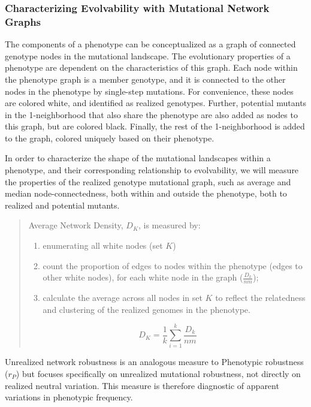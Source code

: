 \subsubsection{Characterizing Evolvability with Mutational Network Graphs}

The components of a phenotype can be conceptualized as a graph of connected genotype nodes in the mutational landscape. The evolutionary properties of a phenotype are dependent on the characteristics of this graph.  Each node within the phenotype graph is a member genotype, and it is connected to the other nodes in the phenotype by single-step mutations. For convenience, these nodes are colored white, and identified as realized genotypes. Further, potential mutants in the 1-neighborhood that also share the phenotype are also added as nodes to this graph, but are colored black. Finally, the rest of the 1-neighborhood is added to the graph, colored uniquely based on their phenotype. 

In order to characterize the shape of the mutational landscapes within a phenotype, and their corresponding relationship to evolvability, we will measure the properties of the realized genotype mutational graph, such as average and median node-connectedness, both within and outside the phenotype, both to realized and potential mutants. 

\begin{quote}

Average Network Density, $D_K$, is measured by:

\begin{enumerate}
\item enumerating all white nodes (set $K$)
\item count the proportion of edges to nodes within the phenotype (edges to other white nodes), for each white node in the graph ($\frac{D_k}{nm}$);
\item calculate the average across all nodes in set $K$ to reflect the relatedness and clustering of the realized genomes in the phenotype.
\end{enumerate}

\begin{equation}
D_{K} =  {\frac{1}{k} \sum_{i=1}^{k}}\frac{D_k}{nm} 
\end{equation}

\end{quote}

Unrealized network robustness is an analogous measure to Phenotypic robustness ($r_P$) but focuses specifically on unrealized mutational robustness, not directly on realized neutral variation. This measure is therefore diagnostic of apparent variations in phenotypic frequency. 


